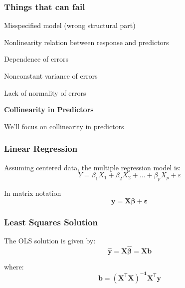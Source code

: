 \documentclass[12pt]{beamer}\usepackage[]{graphicx}\usepackage[]{color}
\begin{document}

\begin{frame}
\frametitle{Things that can fail}

\bbi
  \item Misspecified model (wrong structural part)
  \item Nonlinearity relation between response and predictors
  \item Dependence of errors
  \item Nonconstant variance of errors
  \item Lack of normality of errors
  \item {\hilit \textbf{Collinearity in Predictors}}
\ei

{\lolit We'll focus on collinearity in predictors}

\end{frame}


\begin{frame}
\begin{center}
\Huge{}
\end{center}
\end{frame}


\begin{frame}
\frametitle{Linear Regression}

Assuming centered data, the multiple regression model is:
$$
Y = \beta_1 X_1 + \beta_2 X_2 + \dots + \beta_p X_p + \varepsilon
$$

In matrix notation
{\Large
$$
\mathbf{y} = \mathbf{X} \boldsymbol{\beta} + \boldsymbol{\varepsilon}
$$
}

\end{frame}


\begin{frame}
\frametitle{Least Squares Solution}

The OLS solution is given by:
{\large
$$
\mathbf{\hat{y}} = \mathbf{X} \boldsymbol{\hat{\beta}} = \mathbf{X b}
$$
}

where:
{\large
$$
\mathbf{b} = \mathbf{(X^{\mathsf{T}} X)^{-1} X^{\mathsf{T}} y}
$$
}

\end{frame}

\end{document}
